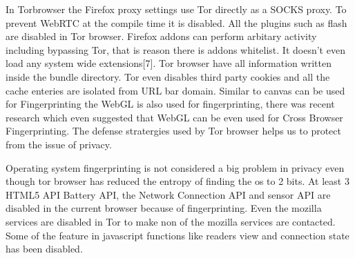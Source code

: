 \documentclass[conference]{IEEEtran}
\begin{document}
In Torbrowser the Firefox proxy settings use Tor directly as a SOCKS proxy. To prevent WebRTC at the compile time it is disabled. All the plugins such as flash are disabled in Tor browser. Firefox addons can perform arbitary activity including bypassing Tor, that is reason there is addons whitelist. It doesn't even load any system wide extensions[7]. Tor browser have all information written inside the bundle directory. Tor even disables third party cookies and all the cache enteries are isolated from URL bar domain. Similar to canvas can be used for Fingerprinting the WebGL is also used for fingerprinting, there was recent research which even suggested that WebGL can be even used for Cross Browser Fingerprinting. The defense stratergies used by Tor browser helps us to protect from the issue of privacy. 

Operating system fingerprinting is not considered a big problem in privacy even though tor browser has reduced the entropy of finding the os to 2 bits. At least 3 HTML5 API Battery API, the Network Connection API and sensor API are disabled in the current browser because of fingerprinting. Even the mozilla services are disabled in Tor to make non of the mozilla services are contacted. Some of the feature in javascript functions like readers view and connection state has been disabled. 



%
%
\end{document}
